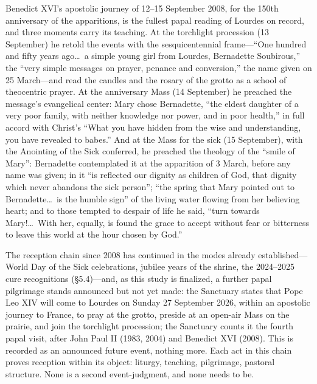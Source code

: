Benedict XVI's apostolic journey of 12--15 September 2008, for
the 150th anniversary of the apparitions, is the fullest papal
reading of Lourdes on record, and three moments carry its
teaching. At the torchlight procession (13 September) he
retold the events with the sesquicentennial frame---``One
hundred and fifty years ago\ldots\ a simple young girl from
Lourdes, Bernadette Soubirous,'' the ``very simple messages on
prayer, penance and conversion,'' the name given on 25
March---and read the candles and the rosary of the grotto as a
school of theocentric prayer. At the anniversary Mass (14
September) he preached the message's evangelical center: Mary
chose Bernadette, ``the eldest daughter of a very poor family,
with neither knowledge nor power, and in poor health,'' in full
accord with Christ's ``What you have hidden from the wise and
understanding, you have revealed to babes.'' And at the Mass for
the sick (15 September), with the Anointing of the Sick
conferred, he preached the theology of the ``smile of Mary'':
Bernadette contemplated it at the apparition of 3 March, before
any name was given; in it ``is reflected our dignity as children
of God, that dignity which never abandons the sick person'';
``the spring that Mary pointed out to Bernadette\ldots\ is the
humble sign'' of the living water flowing from her believing
heart; and to those tempted to despair of life he said,
``turn towards Mary!\ldots\ With her, equally, is found the
grace to accept without fear or bitterness to leave this world
at the hour chosen by God.''

The reception chain since 2008 has continued in the modes
already established---World Day of the Sick celebrations, jubilee
years of the shrine, the 2024--2025 cure recognitions
(\S5.4)---and, as this study is finalized, a further papal
pilgrimage stands announced but not yet made: the Sanctuary
states that Pope Leo XIV will come to Lourdes on Sunday 27
September 2026, within an apostolic journey to France, to pray at
the grotto, preside at an open-air Mass on the prairie, and join
the torchlight procession; the Sanctuary counts it the fourth
papal visit, after John Paul II (1983, 2004) and Benedict XVI
(2008). This is recorded as an announced future event, nothing
more. Each act in this chain proves
reception within its object: liturgy, teaching, pilgrimage,
pastoral structure. None is a second event-judgment, and none
needs to be.
